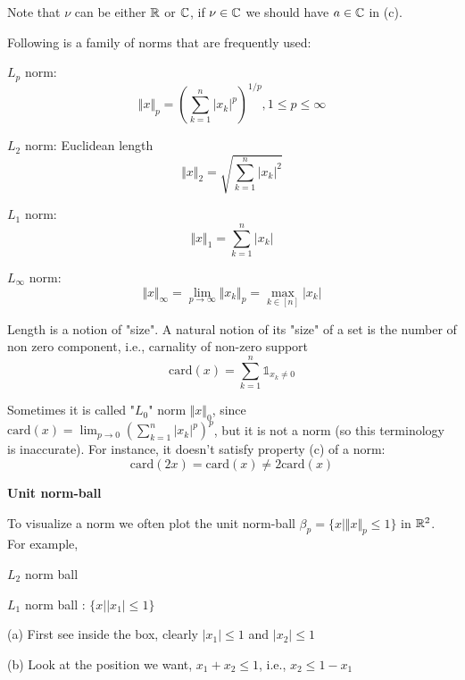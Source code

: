 Note that $\nu$ can be either $\mathbb{R}$ or $\mathbb{C}$, if $\nu\in\mathbb{C}$ we should have $a\in\mathbb{C}$ in (c).

\vspace{0.5cm}
Following is a family of norms that are frequently used:

$L_{p}$ norm:
$$\Vert x\Vert_{p}=(\sum_{k=1}^{n}\vert x_{k}\vert^{p})^{1/p}, 1\leq p\leq\infty$$

$L_{2}$ norm: Euclidean length
$$\Vert x\Vert_{2}=\sqrt{\sum_{k=1}^{n}\vert x_{k}\vert^{2}}$$

$L_{1}$ norm:
$$\Vert x\Vert_{1}=\sum_{k=1}^{n}\vert x_{k}\vert$$

$L_{\infty}$ norm:
$$\Vert x\Vert_{\infty}=\lim_{p\to\infty}\Vert x_{k}\Vert_{p}=\max_{k\in [n]} \vert x_{k}\vert$$

\vspace{0.5cm}
Length is a notion of "size". A natural notion of its "size" of a set is the number of non zero component, i.e., carnality of non-zero support
$$\text{card}(x)=\sum_{k=1}^{n}\mathbb{1}_{x_{k}\neq 0}$$

Sometimes it is called "$L_{0}$" norm $\Vert x\Vert_{0}$, since $\text{card}(x)=\lim_{p\to 0}(\sum_{k=1}^{n}\vert x_{k}\vert^{p})^{p}$, but it is not a norm (so this terminology is inaccurate). For instance, it doesn't satisfy property (c) of a norm:
$$\text{card}(2x)=\text{card}(x)\neq 2\text{card}(x)$$

\textbf{Unit norm-ball}

To visualize a norm we often plot the unit norm-ball $\beta_{p}=\{x|\Vert x\Vert_{p}\leq 1\}$ in $\mathbb{R}^{2}$. For example,

\vspace{0.3cm}
$L_{2}$ norm ball

\begin{figure}
	\centering
	\resizebox{7.5cm}{3cm}{}
	\label{}
\end{figure}

$L_{1}$ norm ball : $\{x|\vert x_{1}\vert\leq 1\}$

\begin{figure}
	\centering
	\resizebox{7.5cm}{3cm}{}
	\label{}
\end{figure}

(a) First see inside the box, clearly $\vert x_{1}\vert\leq 1$ and $\vert x_{2}\vert\leq 1$

(b) Look at the position we want, $x_{1}+x_{2}\leq 1$, i.e., $x_{2}\leq 1-x_{1}$

